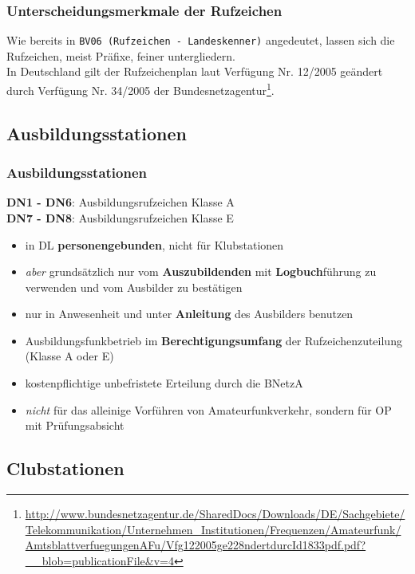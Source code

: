 \begin{frame}
    \frametitle{Unterscheidungsmerkmale der Rufzeichen}

    Wie bereits in \texttt{BV06 (Rufzeichen - Landeskenner)} angedeutet, lassen
    sich die Rufzeichen, meist Präfixe, feiner untergliedern.\\[2em]

    In Deutschland gilt der Rufzeichenplan laut Verfügung Nr. 12/2005 geändert
    durch Verfügung Nr. 34/2005 der
    Bundesnetzagentur\footnote{\url{http://www.bundesnetzagentur.de/SharedDocs/Downloads/DE/Sachgebiete/Telekommunikation/Unternehmen_Institutionen/Frequenzen/Amateurfunk/AmtsblattverfuegungenAFu/Vfg122005ge228ndertdurcId1833pdf.pdf?__blob=publicationFile&v=4}}.

\end{frame}

\subsection{Ausbildungs\-stationen}

\begin{frame}
    \frametitle{Ausbildungsstationen}

    \textbf{DN1 - DN6}: Ausbildungsrufzeichen Klasse A \\
    \textbf{DN7 - DN8}: Ausbildungsrufzeichen Klasse E
    
    \begin{itemize}[<+->]
        \item in DL \textbf{personengebunden}, nicht für Klubstationen
        \item \emph{aber} grundsätzlich nur vom \textbf{Auszubildenden} mit
              \textbf{Logbuch}führung zu verwenden und vom Ausbilder zu bestätigen
        \item nur in Anwesenheit und unter \textbf{Anleitung} des Ausbilders benutzen
        \item Ausbildungsfunkbetrieb im \textbf{Berechtigungsumfang} der
              Rufzeichenzuteilung (Klasse A oder E)
        \item kostenpflichtige unbefristete Erteilung durch die BNetzA
        \item \emph{nicht} für das alleinige Vorführen von Amateurfunkverkehr,
              sondern für OP mit Prüfungsabsicht
    \end{itemize}

\end{frame}

\subsection{Clubstationen}

